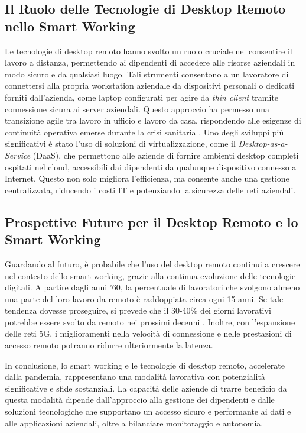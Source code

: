 \documentclass[12pt,a4paper,openright,twoside]{book}
\begin{document}
\subsection{Il Ruolo delle Tecnologie di Desktop Remoto nello Smart Working}
Le tecnologie di desktop remoto hanno svolto un ruolo cruciale nel consentire il lavoro a distanza, permettendo ai dipendenti di accedere alle risorse aziendali in modo sicuro e da qualsiasi luogo. Tali strumenti consentono a un lavoratore di connettersi alla propria workstation aziendale da dispositivi personali o dedicati forniti dall’azienda, come laptop configurati per agire da \emph{thin client} tramite connessione sicura ai server aziendali. Questo approccio ha permesso una transizione agile tra lavoro in ufficio e lavoro da casa, rispondendo alle esigenze di continuità operativa emerse durante la crisi sanitaria \cite{urbaniec2022, Barrero2023}.
%
Uno degli sviluppi più significativi è stato l’uso di soluzioni di virtualizzazione, come il \emph{Desktop-as-a-Service} (DaaS), che permettono alle aziende di fornire ambienti desktop completi ospitati nel cloud, accessibili dai dipendenti da qualunque dispositivo connesso a Internet. Questo non solo migliora l'efficienza, ma consente anche una gestione centralizzata, riducendo i costi IT e potenziando la sicurezza delle reti aziendali.

\subsection{Prospettive Future per il Desktop Remoto e lo Smart Working}
Guardando al futuro, è probabile che l'uso del desktop remoto continui a crescere nel contesto dello smart working, grazie alla continua evoluzione delle tecnologie digitali. A partire dagli anni '60, la percentuale di lavoratori che svolgono almeno una parte del loro lavoro da remoto è raddoppiata circa ogni 15 anni. Se tale tendenza dovesse proseguire, si prevede che il 30-40\% dei giorni lavorativi potrebbe essere svolto da remoto nei prossimi decenni \cite{Barrero2023}. Inoltre, con l’espansione delle reti 5G, i miglioramenti nella velocità di connessione e nelle prestazioni di accesso remoto potranno ridurre ulteriormente la latenza.

In conclusione, lo smart working e le tecnologie di desktop remoto, accelerate dalla pandemia, rappresentano una modalità lavorativa con potenzialità significative e sfide sostanziali. La capacità delle aziende di trarre beneficio da questa modalità dipende dall’approccio alla gestione dei dipendenti e dalle soluzioni tecnologiche che supportano un accesso sicuro e performante ai dati e alle applicazioni aziendali, oltre a bilanciare monitoraggio e autonomia.
\end{document}
